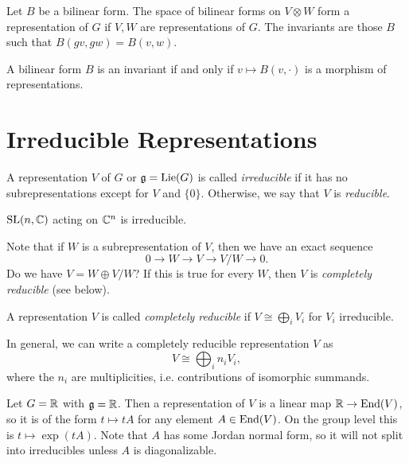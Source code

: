 \begin{example}
  Let $B$ be a bilinear form. The space of
  bilinear forms on $V \otimes W$ form
  a representation of $G$ if $V, W$
  are representations of $G$. The invariants
  are those $B$ such that
  $B(g v, g w) = B(v, w)$.
\end{example}

\begin{prop}
  A bilinear form $B$ is an invariant if
  and only if $v \mapsto B(v, \cdot)$ is a
  morphism of representations.
\end{prop}

\section{Irreducible Representations}

\begin{definition}
  A representation $V$ of $G$ or $\mathfrak{g} = \operatorname{Lie}(G)$
  is called \emph{irreducible} if it has
  no subrepresentations except for
  $V$ and $\{0\}$. Otherwise, we say that
  $V$ is \emph{reducible}.
\end{definition}

\begin{example}
  $\operatorname{SL}(n, \mathbb{C})$ acting
  on $\mathbb{C}^n$ is irreducible.
\end{example}

\begin{remark}
  Note that if $W$ is a subrepresentation
  of $V$, then we have an exact sequence
  \[
    0 \longrightarrow W \longrightarrow V
    \longrightarrow V/W \longrightarrow 0.
  \]
  Do we have $V = W \oplus V/W$?
  If this is true for every $W$, then $V$ is \emph{completely reducible} (see below).
\end{remark}

\begin{definition}
  A representation $V$ is called \emph{completely reducible}
  if
  $V \cong \bigoplus_i V_i$
  for $V_i$ irreducible.
\end{definition}

\begin{remark}
  In general, we can write a
  completely reducible representation
  $V$ as
  \[
    V \cong \bigoplus_i n_i V_i,
  \]
  where the $n_i$ are multiplicities,
  i.e. contributions of isomorphic
  summands.
\end{remark}

\begin{example}
  Let $G = \mathbb{R}$ with $\mathfrak{g} = \mathbb{R}$. Then a
  representation of $V$ is a linear
  map $\mathbb{R} \to \operatorname{End}(V)$, so it is
  of the form $t \mapsto tA$ for any
  element $A \in \operatorname{End}(V)$. On the
  group level this is $t \mapsto \exp(tA)$.
  Note that $A$ has some Jordan normal form,
  so it will not split into
  irreducibles unless $A$ is diagonalizable.
\end{example}

